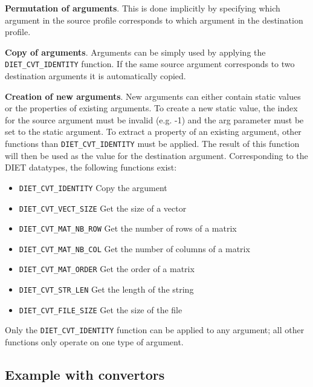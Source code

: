 \begin{description}
\item{\textbf{Permutation of arguments}}. This is done implicitly by
  specifying which argument in the source profile corresponds to which
  argument in the destination profile.
\item{\textbf{Copy of arguments}}. Arguments can be simply used by
  applying the \texttt{DIET\_CVT\_IDENTITY} function. If the same
  source argument corresponds to two destination arguments it is
  automatically copied.
\item{\textbf{Creation of new arguments}}. New arguments can either
  contain static values or the properties of existing arguments. To
  create a new static value, the index for the source argument must be
  invalid (e.g. -1) and the arg parameter must be set to the static
  argument. To extract a property of an existing argument, other
  functions than \texttt{DIET\_CVT\_IDENTITY} must be applied. The
  result of this function will then be used as the value for the
  destination argument.  Corresponding to the DIET datatypes, the
  following functions exist: \\
\begin{itemize}
\item{\texttt{DIET\_CVT\_IDENTITY}} Copy the argument
\item{\texttt{DIET\_CVT\_VECT\_SIZE}} Get the size of a vector
\item{\texttt{DIET\_CVT\_MAT\_NB\_ROW}} Get the number of rows of a matrix
\item{\texttt{DIET\_CVT\_MAT\_NB\_COL}} Get the number of columns of a matrix
\item{\texttt{DIET\_CVT\_MAT\_ORDER}} Get the order of a matrix
\item{\texttt{DIET\_CVT\_STR\_LEN}} Get the length of the string
\item{\texttt{DIET\_CVT\_FILE\_SIZE}} Get the size of the file
\end{itemize}
Only the \texttt{DIET\_CVT\_IDENTITY} function can be applied to any
argument; all other functions only operate on one type of argument.

\end{description}

\subsection{Example with convertors}

